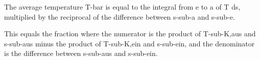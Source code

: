 The average temperature T-bar is equal to the integral from e to a of T ds, multiplied by the reciprocal of the difference between s-sub-a and s-sub-e.

This equals the fraction where the numerator is the product of T-sub-K,aus and s-sub-aus minus the product of T-sub-K,ein and s-sub-ein, and the denominator is the difference between s-sub-aus and s-sub-ein.